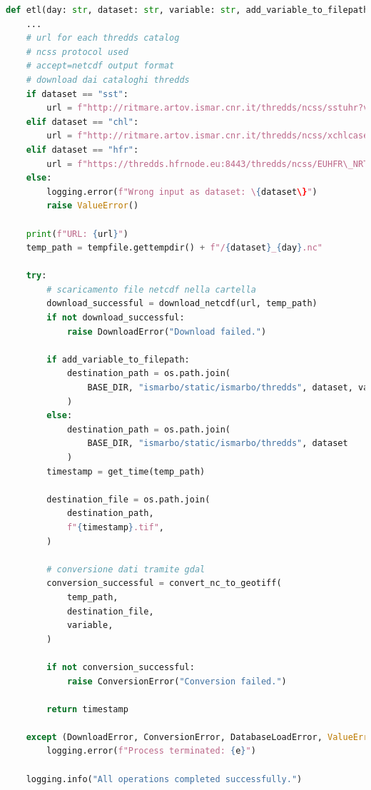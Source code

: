 \documentclass[./main.tex]{subfiles}
\begin{document}
\begin{lstlisting}[language=Python, 
    caption={Porzione della procedura utilizzata per scaricare, convertire e salvare i dati dei cataloghi.},
    label=lst:etl_urls]
    def etl(day: str, dataset: str, variable: str, add_variable_to_filepath: bool = False):
    ...
    # url for each thredds catalog
    # ncss protocol used
    # accept=netcdf output format
    # download dai cataloghi thredds
    if dataset == "sst":
        url = f"http://ritmare.artov.ismar.cnr.it/thredds/ncss/sstuhr?var=\{variable\}\&disableLLSubset=on\&disableProjSubset=on\&horizStride=1\&time=\{day\}\&addLatLon=true\&accept=netcdf"
    elif dataset == "chl":
        url = f"http://ritmare.artov.ismar.cnr.it/thredds/ncss/xchlcase12?var=\{variable\}\&disableLLSubset=on\&disableProjSubset=on\&horizStride=1\&time=\{day\}\&addLatLon=true\&accept=netcdf"
    elif dataset == "hfr":
        url = f"https://thredds.hfrnode.eu:8443/thredds/ncss/EUHFR\_NRTcurrent\_HFR-TirLig-Total\_v3?var=\{variable\}\&north=44.4960\&west=7.5069\&east=10.4930\&south=43.2539\&disableLLSubset=on\&disableProjSubset=on\&horizStride=1\&time=\{day\}\&vertCoord=0"
    else:
        logging.error(f"Wrong input as dataset: \{dataset\}")
        raise ValueError()   

    print(f"URL: {url}")
    temp_path = tempfile.gettempdir() + f"/{dataset}_{day}.nc"

    try:
        # scaricamento file netcdf nella cartella
        download_successful = download_netcdf(url, temp_path)
        if not download_successful:
            raise DownloadError("Download failed.")

        if add_variable_to_filepath:
            destination_path = os.path.join(
                BASE_DIR, "ismarbo/static/ismarbo/thredds", dataset, variable
            )
        else:
            destination_path = os.path.join(
                BASE_DIR, "ismarbo/static/ismarbo/thredds", dataset
            )
        timestamp = get_time(temp_path)

        destination_file = os.path.join(
            destination_path,
            f"{timestamp}.tif",
        )

        # conversione dati tramite gdal
        conversion_successful = convert_nc_to_geotiff(
            temp_path,
            destination_file,
            variable,
        )

        if not conversion_successful:
            raise ConversionError("Conversion failed.")

        return timestamp

    except (DownloadError, ConversionError, DatabaseLoadError, ValueError) as e:
        logging.error(f"Process terminated: {e}")

    logging.info("All operations completed successfully.")
\end{lstlisting}
\end{document}

